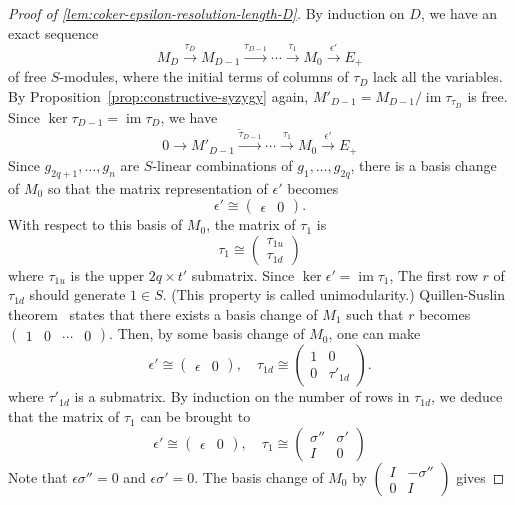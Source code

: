 \documentclass[letterpaper,12pt]{amsart}
\theoremstyle{definition} \newtheorem{defn}{Definition}
\theoremstyle{definition} \newtheorem{rem}{Remark}
\theoremstyle{definition} \newtheorem{example}{Example}
\newcommand{\im}{\mathop{\mathrm{im}}}
\begin{document}
\begin{proof}[Proof of \ref{lem:coker-epsilon-resolution-length-D}]
By induction on $D$, we have an exact sequence
\[
 M_{D} \xrightarrow{\tau_D} M_{D-1} \xrightarrow{\tau_{D-1}}
 \cdots \xrightarrow{\tau_1} M_0 \xrightarrow{\epsilon'} E_+ 
\]
of free $S$-modules, where the initial terms of columns of $\tau_D$ lack all the variables.
By Proposition~\ref{prop:constructive-syzygy} again, $M'_{D-1} = M_{D-1} / \im \tau_{\tau_D}$ is free.
Since $\ker \tau_{D-1} = \im \tau_D$, we have
\[
 0 \to M'_{D-1} \xrightarrow{\tilde \tau_{D-1}}
 \cdots \xrightarrow{\tau_1} M_0 \xrightarrow{\epsilon'} E_+ 
\]
Since $g_{2q+1},\ldots,g_n$ are $S$-linear combinations of $g_1,\ldots, g_{2q}$,
there is a basis change of $M_0$ so that the matrix representation of $\epsilon'$ becomes
\[
 \epsilon' \cong
\begin{pmatrix}
 \epsilon & 0
\end{pmatrix} .
\]
With respect to this basis of $M_0$,
the matrix of $\tau_1$ is
\[
 \tau_1 \cong
\begin{pmatrix}
 \tau_{1u} \\
 \tau_{1d}
\end{pmatrix}
\]
where $\tau_{1u}$ is the upper $2q \times t'$ submatrix.
Since $\ker \epsilon' = \im \tau_1$, 
The first row $r$ of $\tau_{1d}$ should generate $1 \in S$.
(This property is called unimodularity.)
Quillen-Suslin theorem~\cite[Chapter~XXI Theorem~3.5]{Lang}
states that there exists a basis change of $M_1$
such that $r$ becomes $\begin{pmatrix}1 & 0 & \cdots & 0 \end{pmatrix}$.
Then, by some basis change of $M_0$, one can make 
\[
\epsilon' \cong
\begin{pmatrix}
 \epsilon & 0
\end{pmatrix} ,
\quad
 \tau_{1d} \cong
\begin{pmatrix}
 1 & 0 \\
 0 & \tau'_{1d}
\end{pmatrix} .
\]
where $\tau'_{1d}$ is a submatrix.
By induction on the number of rows in $\tau_{1d}$,
we deduce that the matrix of $\tau_1$ can be brought to
\[
\epsilon' \cong
\begin{pmatrix}
 \epsilon & 0
\end{pmatrix} ,
\quad
 \tau_1 \cong
\begin{pmatrix}
 \sigma'' & \sigma' \\
 I & 0
\end{pmatrix}
\]
Note that $\epsilon \sigma'' = 0$ and $\epsilon \sigma' = 0$.
The basis change of $M_0$ by $\begin{pmatrix} I & -\sigma'' \\ 0 & I \end{pmatrix}$ gives

\end{proof}
\end{document}
